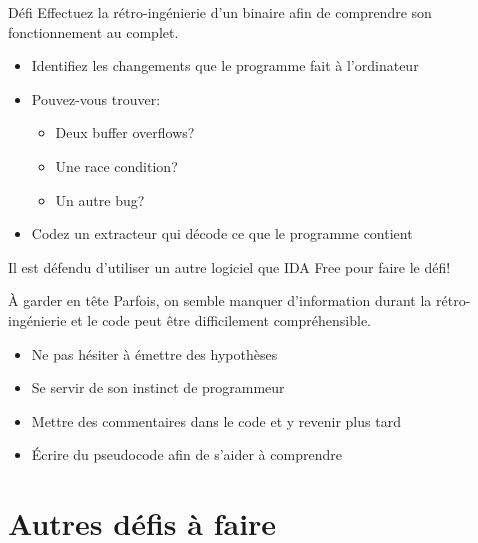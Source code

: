 \documentclass[10pt,xcolor={table,dvipsnames},t]{beamer}
\begin{document}
\begin{frame}{Défi}
    Effectuez la rétro-ingénierie d'un binaire afin de comprendre son fonctionnement au complet.
    \begin{itemize}
        \item Identifiez les changements que le programme fait à l'ordinateur
        \item Pouvez-vous trouver: 
        \begin{itemize}
            \item Deux buffer overflows?
            \item Une race condition?
            \item Un autre bug?
        \end{itemize}
        \item Codez un extracteur qui décode ce que le programme contient
    \end{itemize}
    
    Il est défendu d'utiliser un autre logiciel que IDA Free pour faire le défi!
\end{frame}


\begin{frame}{À garder en tête}
    Parfois, on semble manquer d'information durant la rétro-ingénierie et le code peut être difficilement compréhensible. 
    \begin{itemize}
        \item Ne pas hésiter à émettre des hypothèses
        \item Se servir de son instinct de programmeur
        \item Mettre des commentaires dans le code et y revenir plus tard
        \item Écrire du pseudocode afin de s'aider à comprendre
    \end{itemize}
\end{frame}


\normalframetitle

\iffalse

\section{Autres défis à faire}
\end{document}

